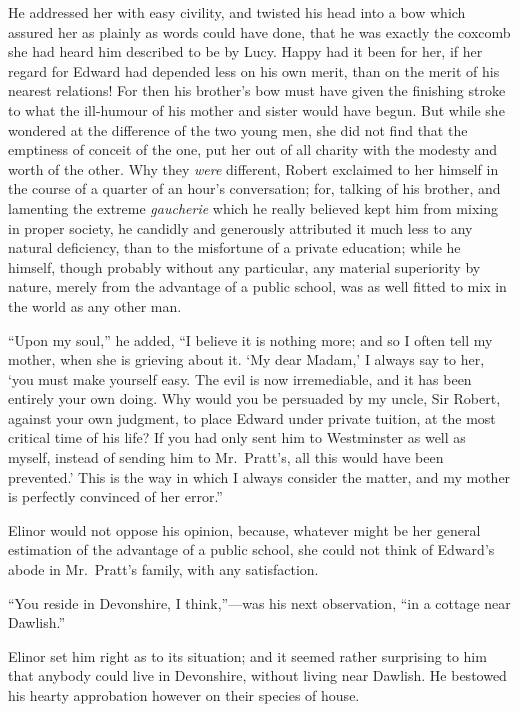 \documentclass{article}
\begin{document}
He addressed her with easy civility, and twisted
his head into a bow which assured her as plainly as
words could have done, that he was exactly the coxcomb
she had heard him described to be by Lucy.  Happy had
it been for her, if her regard for Edward had depended
less on his own merit, than on the merit of his nearest
relations!  For then his brother's bow must have given
the finishing stroke to what the ill-humour of his mother
and sister would have begun.  But while she wondered
at the difference of the two young men, she did not find
that the emptiness of conceit of the one, put her out
of all charity with the modesty and worth of the other.
Why they \emph{were} different, Robert exclaimed to her himself
in the course of a quarter of an hour's conversation;
for, talking of his brother, and lamenting the extreme
\emph{gaucherie} which he really believed kept him from mixing
in proper society, he candidly and generously attributed it
much less to any natural deficiency, than to the misfortune
of a private education; while he himself, though probably
without any particular, any material superiority
by nature, merely from the advantage of a public school,
was as well fitted to mix in the world as any other man.

``Upon my soul,'' he added, ``I believe it is nothing more;
and so I often tell my mother, when she is grieving
about it.  `My dear Madam,' I always say to her, `you must
make yourself easy.  The evil is now irremediable,
and it has been entirely your own doing.  Why would
you be persuaded by my uncle, Sir Robert, against your
own judgment, to place Edward under private tuition,
at the most critical time of his life?  If you had only sent
him to Westminster as well as myself, instead of sending
him to Mr.\ Pratt's, all this would have been prevented.'
This is the way in which I always consider the matter,
and my mother is perfectly convinced of her error.''

Elinor would not oppose his opinion, because,
whatever might be her general estimation of the advantage
of a public school, she could not think of Edward's
abode in Mr.\ Pratt's family, with any satisfaction.

``You reside in Devonshire, I think,''---was his
next observation, ``in a cottage near Dawlish.''

Elinor set him right as to its situation;
and it seemed rather surprising to him that anybody
could live in Devonshire, without living near Dawlish.
He bestowed his hearty approbation however on their
species of house.
\end{document}
